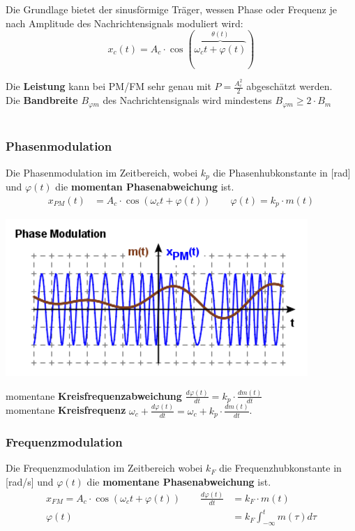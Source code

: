 Die Grundlage bietet der sinusförmige Träger, wessen Phase oder Frequenz je nach Amplitude des Nachrichtensignals moduliert wird:
\[
x_c(t) = A_c \cdot \cos(\overbrace{\omega_ct + \varphi(t)}^{\theta(t)})
\]

\noindent Die \textbf{Leistung} kann bei PM/FM sehr genau mit $P = \frac{A_c^2}{2}$ abgeschätzt werden.\\
\noindent Die \textbf{Bandbreite} $B_{\varphi m}$ des Nachrichtensignals wird mindestens $B_{\varphi m} \geq 2\cdot B_m$\\ ~\\
\subsubsection{Phasenmodulation}\label{PM}
Die Phasenmodulation im Zeitbereich, wobei $k_p$ die Phasenhubkonstante in [rad] und $\varphi(t)$ die \textbf{momentan Phasenabweichung} ist.
\begin{align*}
x_{PM}(t) &= A_c\cdot \cos(\omega_ct + \varphi(t)) \qquad \varphi(t) = k_p\cdot m(t)
\end{align*}

\begin{center}
	\includegraphics[width=0.6\columnwidth]{Images/pm}
\end{center}

\noindent momentane \textbf{Kreisfrequenzabweichung} $\frac{d\varphi(t)}{dt} = k_p \cdot \frac{dm(t)}{dt}$\\ \noindent momentane \textbf{Kreisfrequenz} $\omega_c + \frac{d\varphi(t)}{dt} = \omega_c + k_p\cdot \frac{dm(t)}{dt}$.

\subsubsection{Frequenzmodulation}\label{FM}
Die Frequenzmodulation im Zeitbereich wobei $k_F$ die Frequenzhubkonstante in [rad/s] und $\varphi(t)$ die \textbf{momentane Phasenabweichung} ist.
\begin{align*}
	x_{FM} = A_c\cdot\cos(\omega_ct + \varphi(t)) \qquad \frac{d\varphi(t)}{dt} &= k_F\cdot m(t) \\
	\varphi(t) &= k_F\int_{-\infty}^{t}m(\tau)d\tau
\end{align*}

